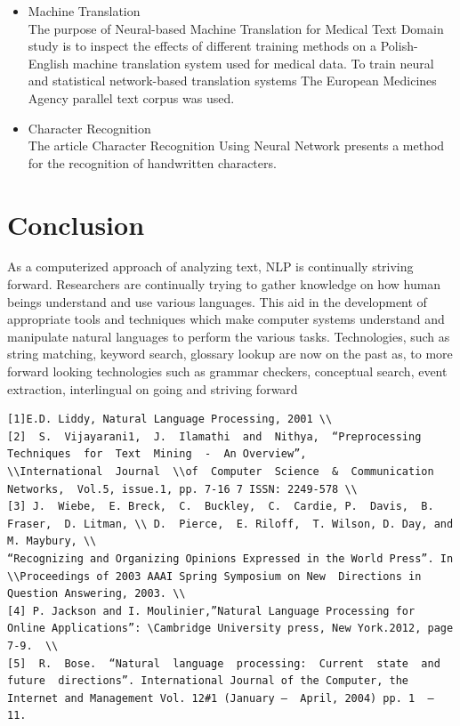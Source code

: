\documentclass[12pt]{report}
\begin{document}
\begin{itemize}
\item  Machine Translation\\
The purpose of Neural-based Machine Translation for Medical Text Domain study is to inspect the effects of different training methods on a Polish-English machine translation system used for medical data. To train neural and statistical network-based translation systems The European Medicines Agency parallel text corpus was used. \\
\item  Character Recognition\\
The article Character Recognition Using Neural Network presents a method for the recognition of handwritten characters.
\end{itemize}
\chapter{Conclusion}
As a computerized approach of analyzing text, NLP is continually striving forward. Researchers are
continually trying to gather knowledge on how human beings understand and use various
languages. This aid in the development of appropriate tools and techniques which make computer
systems understand and manipulate natural languages to perform the various tasks. Technologies,
such as string matching, keyword search, glossary lookup are now on the past as, to more forward
looking technologies such as grammar checkers, conceptual search, event extraction, interlingual on
going and striving forward

\newpage

\begin{verbatim}
[1]E.D. Liddy, Natural Language Processing, 2001 \\
[2]  S.  Vijayarani1,  J.  Ilamathi  and  Nithya,  “Preprocessing  Techniques  for  Text  Mining  -  An Overview”,
\\International  Journal  \\of  Computer  Science  &  Communication  Networks,  Vol.5, issue.1, pp. 7-16 7 ISSN: 2249-578 \\
[3] J.  Wiebe,  E. Breck,  C.  Buckley,  C.  Cardie, P.  Davis,  B.  Fraser,  D. Litman, \\ D.  Pierce,  E. Riloff,  T. Wilson, D. Day, and M. Maybury, \\ 
“Recognizing and Organizing Opinions Expressed in the World Press”. In  \\Proceedings of 2003 AAAI Spring Symposium on New  Directions in Question Answering, 2003. \\
[4] P. Jackson and I. Moulinier,”Natural Language Processing for  Online Applications”: \Cambridge University press, New York.2012, page 7-9.  \\
[5]  R.  Bose.  “Natural  language  processing:  Current  state  and  future  directions”. International Journal of the Computer, the Internet and Management Vol. 12#1 (January –  April, 2004) pp. 1  – 11. 
 
\end{verbatim}
\end{document}
